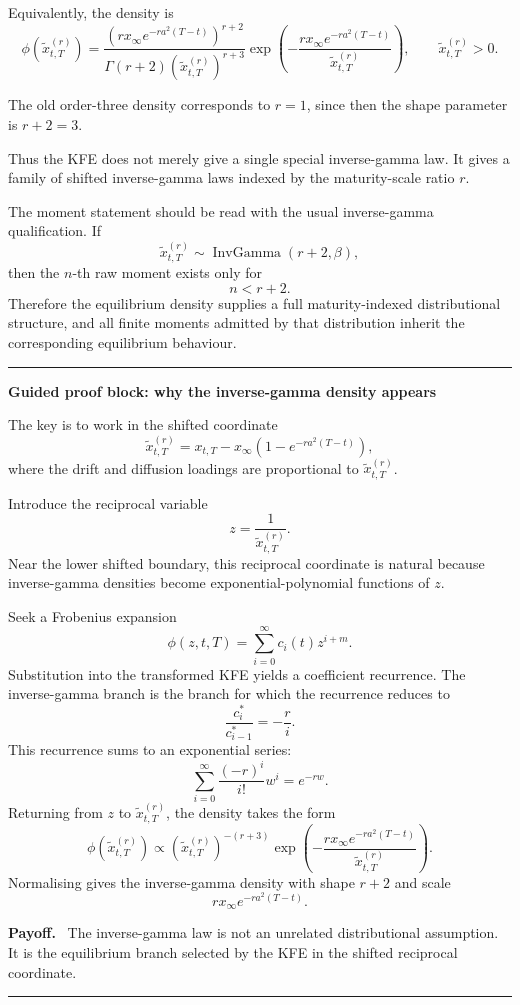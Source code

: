 \documentclass[11pt]{article}
\theoremstyle{plainbreak}
\newenvironment{proofblock}[1]{%
    \vspace{0.5em}\hrule\vspace{0.7em}%
    {\bfseries Guided proof block: #1}\par\vspace{0.2em}%
}{%
    \vspace{0.5em}\hrule\vspace{0.7em}%
}
\newenvironment{takeaway}{%
    \vspace{0.4em}\noindent\textbf{Payoff.}\ }{\par\vspace{0.4em}}
\begin{document}
Equivalently, the density is
\[
\phi(\widetilde{x}^{(r)}_{t,T})
=
\frac{
\left(rx_\infty e^{-ra^2(T-t)}\right)^{r+2}
}{
\Gamma(r+2)
\left(\widetilde{x}^{(r)}_{t,T}\right)^{r+3}
}
\exp\left(
-
\frac{rx_\infty e^{-ra^2(T-t)}}{\widetilde{x}^{(r)}_{t,T}}
\right),
\qquad \widetilde{x}^{(r)}_{t,T}>0.
\]

The old order-three density corresponds to \(r=1\), since then the shape parameter is \(r+2=3\).

Thus the KFE does not merely give a single special inverse-gamma law. It gives a family of shifted inverse-gamma laws indexed by the maturity-scale ratio \(r\).

The moment statement should be read with the usual inverse-gamma qualification. If
\[
\widetilde{x}^{(r)}_{t,T}\sim \operatorname{InvGamma}(r+2,\beta),
\]
then the \(n\)-th raw moment exists only for
\[
n<r+2.
\]
Therefore the equilibrium density supplies a full maturity-indexed distributional structure, and all finite moments admitted by that distribution inherit the corresponding equilibrium behaviour.

\begin{proofblock}{why the inverse-gamma density appears}
The key is to work in the shifted coordinate
\[
\widetilde{x}^{(r)}_{t,T}
=
x_{t,T}-x_\infty\left(1-e^{-ra^2(T-t)}\right),
\]
where the drift and diffusion loadings are proportional to \(\widetilde{x}^{(r)}_{t,T}\).

Introduce the reciprocal variable
\[
z=\frac{1}{\widetilde{x}^{(r)}_{t,T}}.
\]
Near the lower shifted boundary, this reciprocal coordinate is natural because inverse-gamma densities become exponential-polynomial functions of \(z\).

Seek a Frobenius expansion
\[
\phi(z,t,T)=\sum_{i=0}^{\infty}c_i(t)z^{i+m}.
\]
Substitution into the transformed KFE yields a coefficient recurrence. The inverse-gamma branch is the branch for which the recurrence reduces to
\[
\frac{c_i^*}{c_{i-1}^*}=-\frac{r}{i}.
\]
This recurrence sums to an exponential series:
\[
\sum_{i=0}^{\infty}\frac{(-r)^i}{i!}w^i = e^{-rw}.
\]
Returning from \(z\) to \(\widetilde{x}^{(r)}_{t,T}\), the density takes the form
\[
\phi(\widetilde{x}^{(r)}_{t,T})
\propto
\left(\widetilde{x}^{(r)}_{t,T}\right)^{-(r+3)}
\exp\left(
-\frac{rx_\infty e^{-ra^2(T-t)}}{\widetilde{x}^{(r)}_{t,T}}
\right).
\]
Normalising gives the inverse-gamma density with shape \(r+2\) and scale
\[
rx_\infty e^{-ra^2(T-t)}.
\]

\begin{takeaway}
The inverse-gamma law is not an unrelated distributional assumption. It is the equilibrium branch selected by the KFE in the shifted reciprocal coordinate.
\end{takeaway}
\end{proofblock}
\end{document}
